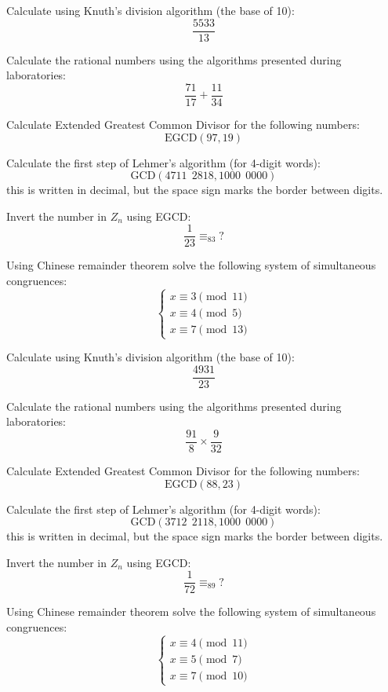 \documentclass[10pt]{tpexercise}
\begin{document}

%
\zadanie Calculate using Knuth's division algorithm (the base of 10):\\
\[
\frac{5533}{13}
\]

%
\zadanie Calculate the rational numbers using the algorithms presented during laboratories:\\
\[
\frac{71}{17} + \frac{11}{34}
\]

%
\zadanie Calculate Extended Greatest Common Divisor for the following numbers:\\
\[
\mathrm{EGCD}(97,19)
\]

\zadanie Calculate the first step of Lehmer's algorithm (for 4-digit words):\\
\[
\mathrm{GCD}(4711~~2818, 1000~~0000)
\]
this is written in decimal, but the space sign
marks the border between digits.

\zadanie Invert the number in $Z_n$ using EGCD:\\
\[
\frac{1}{23} \equiv_{83} ?
\]

\zadanie Using Chinese remainder theorem solve the following
system of simultaneous congruences:\\
\[
\left\{
\begin{matrix}
x \equiv 3 \pmod{11}\\
x \equiv 4 \pmod{5}\\
x \equiv 7 \pmod{13}
\end{matrix}
\right.
\]


%
\zadanie Calculate using Knuth's division algorithm (the base of 10):\\
\[
\frac{4931}{23}
\]

%
\zadanie Calculate the rational numbers using the algorithms presented during laboratories:\\
\[
\frac{91}{8} \times \frac{9}{32}
\]

%
\zadanie Calculate Extended Greatest Common Divisor for the following numbers:\\
\[
\mathrm{EGCD}(88,23)
\]

\zadanie Calculate the first step of Lehmer's algorithm (for 4-digit words):\\
\[
\mathrm{GCD}(3712~~2118, 1000~~0000)
\]
this is written in decimal, but the space sign
marks the border between digits.

\zadanie Invert the number in $Z_n$ using EGCD:\\
\[
\frac{1}{72} \equiv_{89} ?
\]

\zadanie Using Chinese remainder theorem solve the following
system of simultaneous congruences:\\
\[
\left\{
\begin{matrix}
x \equiv 4 \pmod{11}\\
x \equiv 5 \pmod{7}\\
x \equiv 7 \pmod{10}
\end{matrix}
\right.
\]
\end{document}
